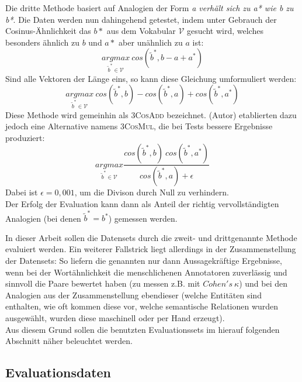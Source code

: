 \begin{enumerate}
      Die dritte Methode basiert auf Analogien der Form \emph{a verhält sich zu a* wie b zu b*}.
      Die Daten werden nun dahingehend getestet, indem unter Gebrauch der Cosinus-Ähnlichkeit
      das $b*$ aus dem Vokabular $\mathcal{V}$ gesucht wird, welches besonders ähnlich zu $b$ und $a*$ aber unähnlich zu $a$ ist:
      \begin{equation}
        \underset{\tilde{b}^* \in \mathcal{V}}{argmax}\ cos(\tilde{b}^*, b - a + a^*)
      \end{equation}
      Sind alle Vektoren der Länge eins, so kann diese Gleichung umformuliert werden:
      \begin{equation}
        \underset{\tilde{b}^* \in \mathcal{V}}{argmax}\ cos(\tilde{b}^*, b) - cos(\tilde{b}^*, a) + cos(\tilde{b}^*, a^*)
      \end{equation}
      Diese Methode wird gemeinhin als \textsc{3CosAdd} bezeichnet. (Autor) etablierten dazu jedoch
      eine Alternative namens \textsc{3CosMul}, die bei Tests bessere Ergebnisse produziert:
      \begin{equation}
        \underset{\tilde{b}^* \in \mathcal{V}}{argmax} \frac{cos(\tilde{b}^*, b)\ cos(\tilde{b}^*, a^*)}{cos(\tilde{b}^*, a) + \epsilon}
      \end{equation}
      Dabei ist $\epsilon = 0,001$, um die Divison durch Null zu verhindern.\\
      Der Erfolg der Evaluation kann dann als Anteil der richtig vervollständigten Analogien (bei denen $\tilde{b}^* = b^*$) gemessen werden.
  \end{enumerate}
  In dieser Arbeit sollen die Datensets durch die zweit- und drittgenannte Methode evaluiert werden.
  Ein weiterer Fallstrick liegt allerdings in der Zusammenstellung der Datensets: So liefern
  die genannten nur dann Aussagekräftige Ergebnisse, wenn bei der Wortähnlichkeit die menschlichenen Annotatoren
  zuverlässig und sinnvoll die Paare bewertet haben (zu messen z.B. mit $Cohen's\ \kappa$) und bei
  den Analogien aus der Zusammenstellung ebendieser (welche Entitäten sind enthalten, wie oft kommen diese vor,
  welche semantische Relationen wurden ausgewählt, wurden diese maschinell oder per Hand erzeugt).\\
  Aus diesem Grund sollen die benutzten Evaluationssets im hierauf folgenden Abschnitt näher beleuchtet werden.

  \subsection{Evaluationsdaten}

